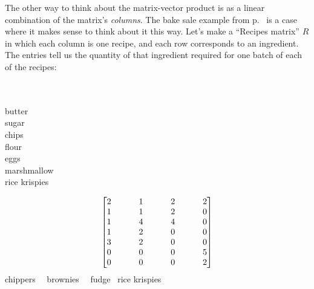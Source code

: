\bigskip

The other way to think about the matrix-vector product is as a linear
combination of the matrix's \textit{columns}. The bake sale example from
p.~\pageref{bakeSale} is a case where it makes sense to think about it this
way. Let's make a ``Recipes matrix'' $R$ in which each column is one recipe,
and each row corresponds to an ingredient. The entries tell us the quantity of
that ingredient required for one batch of each of the recipes:

\vspace{-.3in} 
\begin{center}
\begin{multicols}{2}
\begin{flushright}
\hspace*{1cm} \\
\hspace*{1cm} \\
\small{butter} \\
\small{sugar} \\
\small{chips} \\
\small{flour} \\
\small{eggs} \\
\small{marshmallow} \\
\small{rice krispies} \\
\end{flushright}
\columnbreak
\vspace{-1.5in} 
\begin{align*}
\setlength\arraycolsep{13pt}
\begin{bmatrix}
2 \ & \ 1 \ & \ 2 \ & \ 2 \\
1 \ & \ 1 \ & \ 2 \ & \ 0 \\
1 \ & \ 4 \ & \ 4 \ & \ 0 \\
1 \ & \ 2 \ & \ 0 \ & \ 0 \\
3 \ & \ 2 \ & \ 0 \ & \ 0 \\
0 \ & \ 0 \ & \ 0 \ & \ 5 \\
0 \ & \ 0 \ & \ 0 \ & \ 2 \\
\end{bmatrix}
\end{align*}
\vspace{-.15in}
\hspace*{-.1in}
\scriptsize{chippers} \ \ \scriptsize{brownies} \ \  \scriptsize{fudge} \ 
\scriptsize{rice krispies} \\
\end{multicols}
\end{center}
\vspace{-.15in}

